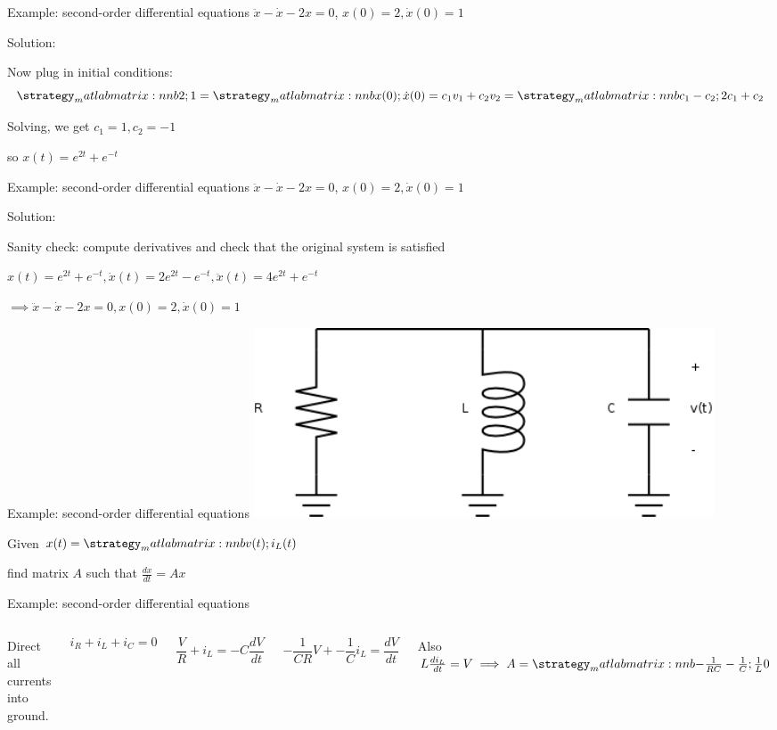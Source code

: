 \documentclass{beamer}
\begin{document}
	\begin{frame}{Example: second-order differential equations}
	    $\ddot{x} - \dot{x} - 2x = 0$, $x(0) = 2, \dot{x}(0) = 1$
	    
	    Solution:
	    
	    Now plug in initial conditions:
	    $$\mat{2;1} = \mat{x(0); \dot{x}(0)} = c_1v_1 + c_2v_2 = \mat{c_1-c_2;2c_1+c_2}$$
	    
	    Solving, we get $c_1 = 1, c_2 = -1$
	    
	    so $x(t) = e^{2t} + e^{-t}$
	\end{frame}
	
	\begin{frame}{Example: second-order differential equations}
	    $\ddot{x} - \dot{x} - 2x = 0$, $x(0) = 2, \dot{x}(0) = 1$
	    
	    Solution:
	    
	    Sanity check: compute derivatives and check that the original system is satisfied
	    
	    $x(t) = e^{2t} + e^{-t}, \dot{x}(t) = 2e^{2t} - e^{-t}, \ddot{x}(t) = 4e^{2t} + e^{-t}$
	    
	    $\implies \ddot{x} - \dot{x} - 2x = 0, x(0) = 2, \dot{x}(0) = 1$
	\end{frame}
	
	\begin{frame}{Example: second-order differential equations}
	    \includegraphics[width=0.6\textwidth]{second-order-1.png}
	    
	    Given $x(t) = \mat{v(t);i_L(t)}$
	    
	    find matrix $A$ such that $\frac{dx}{dt} = Ax$
	\end{frame}
	
	\begin{frame}{Example: second-order differential equations}
    	\begin{columns}[onlytextwidth,T]
        	\column{\dimexpr\linewidth-40mm-5mm}
        	Direct all currents into ground.
	        
	        $$i_R + i_L + i_C = 0$$
	        
	        $$\frac{V}{R} + i_L = -C\frac{dV}{dt}$$
	        
	        $$-\frac{1}{CR}V + -\frac{1}{C}i_L = \frac{dV}{dt}$$
	        
	        Also $L\frac{di_L}{dt} = V \implies A = \mat{-\frac{1}{RC} -\frac{1}{C}; \frac{1}{L} 0}$
	        
	        \column{40mm}
	        \includegraphics[width=40mm]{second-order-1.png}
        \end{columns}
	\end{frame}
	
\end{document}
